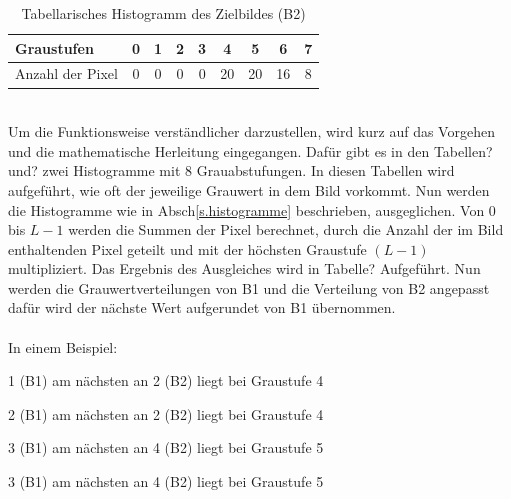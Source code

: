 \documentclass[a4paper,12pt,oneside]{article}
\begin{document}
\begin{table}
[h]
\caption{Tabellarisches Histogramm des Zielbildes (B2)}
\centering
\begin{tabular}{|l|c|c|c|c|c|c|c|c|}
\hline
Graustufen & 0 & 1 & 2 & 3 & 4 & 5 & 6 & 7\\
\hline
Anzahl der Pixel & 0 & 0 & 0 & 0 & 20 & 20 & 16 & 8\\
\hline
\end{tabular}
\end{table}\\
Um die Funktionsweise verständlicher darzustellen, wird kurz auf das Vorgehen und die mathematische Herleitung eingegangen. Dafür gibt es in den Tabellen?und? zwei Histogramme mit 8 Grauabstufungen. In diesen Tabellen wird aufgeführt, wie oft der jeweilige Grauwert in dem Bild vorkommt. Nun werden die Histogramme wie in Absch\ref{s.histogramme} beschrieben, ausgeglichen. Von 0 bis $L-1$ werden die Summen der Pixel berechnet, durch die Anzahl der im Bild enthaltenden Pixel geteilt und mit der höchsten Graustufe $(L-1)$ multipliziert. Das Ergebnis des Ausgleiches wird in Tabelle? Aufgeführt. Nun werden die Grauwertverteilungen von B1 und die Verteilung von B2 angepasst dafür wird der nächste Wert aufgerundet von B1 übernommen.\\\\
In einem Beispiel:

1 (B1) am nächsten an 2 (B2) liegt bei Graustufe 4

2 (B1) am nächsten an 2 (B2) liegt bei Graustufe 4

3 (B1) am nächsten an 4 (B2) liegt bei Graustufe 5

3 (B1) am nächsten an 4 (B2) liegt bei Graustufe 5
\end{document}
